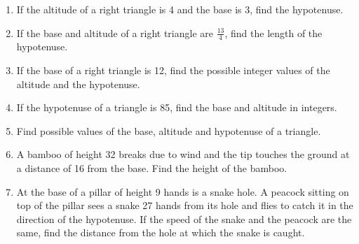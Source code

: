 \begin{enumerate}[label=\thechapter.\arabic*,ref=\thechapter.\theenumi]
\item If the altitude of a right triangle is 4 and the base is 3, find the hypotenuse.
\item If the base and altitude of a right triangle are $\frac{13}{4}$, find the length of the hypotenuse.
\item If the base of a right triangle is 12, find the possible integer values of the altitude and the hypotenuse.
\item If the hypotenuse of a triangle is 85, find the base and altitude in integers.
\item Find possible values of the base, altitude and hypotenuse of a triangle.
\item A bamboo of height 32 breaks due to wind and the tip touches the ground at a distance of 16 from the base.  Find the height of the bamboo.
\item At the base of a pillar of height 9 hands is a snake hole.  A peacock sitting on top of the pillar sees a snake 27 hands from its hole and flies to catch it
	in the direction of the hypotenuse.  If the speed of the snake and the peacock are the same, find the distance from the hole at which the snake is caught.


	\iffalse
	\begin{table}[!ht]
		\centering
		
		\caption{}
		\label{tab:currency}
	\end{table}
	\fi
\end{enumerate}
